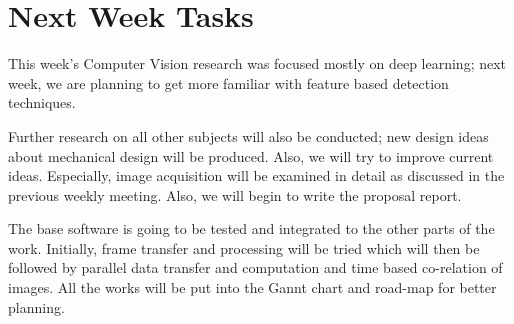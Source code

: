 \section{Next Week Tasks}
\label{sec:tasks}

This week's Computer Vision research was focused mostly on deep learning; next week, we are planning to get more familiar with feature based detection techniques.

Further research on all other subjects will also be conducted; new design ideas about mechanical design will be produced. Also, we will try to improve current ideas. Especially, image acquisition will be examined in detail as discussed in the previous weekly meeting. Also, we will begin to write the proposal report.

The base software is going to be tested and integrated to the other parts of the work. Initially, frame transfer and processing will be tried which will then be followed by parallel data transfer and computation and time based co-relation of images. All the works will be put into the Gannt chart and road-map for better planning.
